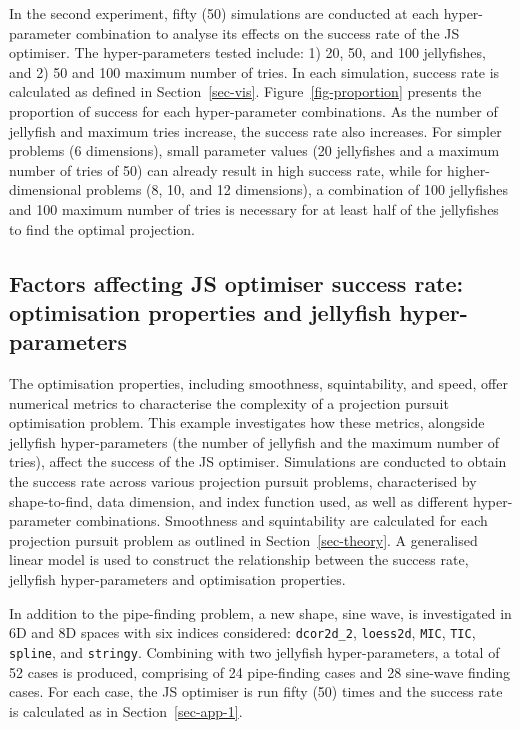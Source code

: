 \documentclass[
  number,
  preprint,
  3p]{elsarticle}
\begin{document}
In the second experiment, fifty (50) simulations are conducted at each
hyper-parameter combination to analyse its effects on the success rate
of the JS optimiser. The hyper-parameters tested include: 1) 20, 50, and
100 jellyfishes, and 2) 50 and 100 maximum number of tries. In each
simulation, success rate is calculated as defined in
Section~\ref{sec-vis}. Figure~\ref{fig-proportion} presents the
proportion of success for each hyper-parameter combinations. As the
number of jellyfish and maximum tries increase, the success rate also
increases. For simpler problems (6 dimensions), small parameter values
(20 jellyfishes and a maximum number of tries of 50) can already result
in high success rate, while for higher-dimensional problems (8, 10, and
12 dimensions), a combination of 100 jellyfishes and 100 maximum number
of tries is necessary for at least half of the jellyfishes to find the
optimal projection.

\subsection{Factors affecting JS optimiser success rate: optimisation
properties and jellyfish hyper-parameters}\label{sec-app-2}

The optimisation properties, including smoothness, squintability, and
speed, offer numerical metrics to characterise the complexity of a
projection pursuit optimisation problem. This example investigates how
these metrics, alongside jellyfish hyper-parameters (the number of
jellyfish and the maximum number of tries), affect the success of the JS
optimiser. Simulations are conducted to obtain the success rate across
various projection pursuit problems, characterised by shape-to-find,
data dimension, and index function used, as well as different
hyper-parameter combinations. Smoothness and squintability are
calculated for each projection pursuit problem as outlined in
Section~\ref{sec-theory}. A generalised linear model is used to
construct the relationship between the success rate, jellyfish
hyper-parameters and optimisation properties.

In addition to the pipe-finding problem, a new shape, sine wave, is
investigated in 6D and 8D spaces with six indices considered:
\texttt{dcor2d\_2}, \texttt{loess2d}, \texttt{MIC}, \texttt{TIC},
\texttt{spline}, and \texttt{stringy}. Combining with two jellyfish
hyper-parameters, a total of 52 cases is produced, comprising of 24
pipe-finding cases and 28 sine-wave finding cases. For each case, the JS
optimiser is run fifty (50) times and the success rate is calculated as
in Section~\ref{sec-app-1}.
\end{document}

